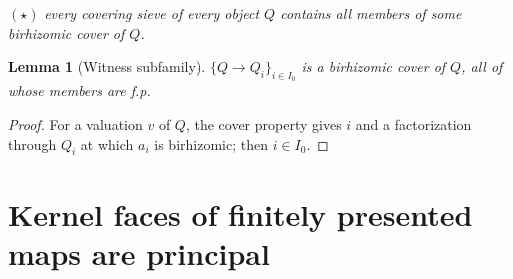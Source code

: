 \documentclass[11pt]{article}
\newtheorem{lemma}[theorem]{Lemma}
\theoremstyle{definition}
\theoremstyle{remark}
\begin{document}
\smallskip
$(\star)$ \emph{every covering sieve of every object $Q$ contains all members of some birhizomic cover of $Q$.}

\begin{lemma}[Witness subfamily]\label{lem:witness}
$\{Q\to Q_i\}_{i\in I_0}$ is a birhizomic cover of $Q$, all of whose members are f.p.
\end{lemma}
\begin{proof}
For a valuation $v$ of $Q$, the cover property gives $i$ and a factorization through $Q_i$ at which $a_i$ is birhizomic; then $i\in I_0$.
\end{proof}

\section{Kernel faces of finitely presented maps are principal}\label{sec:B}
\end{document}
